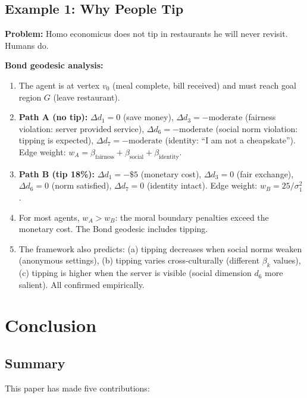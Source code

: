 \documentclass[12pt]{article}
\theoremstyle{definition}
\theoremstyle{remark}
\begin{document}
\subsection{Example 1: Why People Tip}

\textbf{Problem:} Homo economicus does not tip in restaurants he will never revisit.  Humans do.

\textbf{Bond geodesic analysis:}
\begin{enumerate}
    \item The agent is at vertex $v_0$ (meal complete, bill received) and must reach goal region $G$ (leave restaurant).
    \item \textbf{Path A (no tip):} $\Delta d_1 = 0$ (save money), $\Delta d_3 = -\text{moderate}$ (fairness violation: server provided service), $\Delta d_6 = -\text{moderate}$ (social norm violation: tipping is expected), $\Delta d_7 = -\text{moderate}$ (identity: ``I am not a cheapskate'').  Edge weight: $w_A = \beta_{\text{fairness}} + \beta_{\text{social}} + \beta_{\text{identity}}$.
    \item \textbf{Path B (tip 18\%):} $\Delta d_1 = -\$5$ (monetary cost), $\Delta d_3 = 0$ (fair exchange), $\Delta d_6 = 0$ (norm satisfied), $\Delta d_7 = 0$ (identity intact).  Edge weight: $w_B = 25/\sigma_1^2$.
    \item For most agents, $w_A > w_B$: the moral boundary penalties exceed the monetary cost.  The Bond geodesic includes tipping.
    \item The framework also predicts: (a) tipping decreases when social norms weaken (anonymous settings), (b) tipping varies cross-culturally (different $\beta_k$ values), (c) tipping is higher when the server is visible (social dimension $d_6$ more salient).  All confirmed empirically.
\end{enumerate}


\section{Conclusion}
\label{sec:conclusion}

\subsection{Summary}

This paper has made five contributions:
\end{document}

